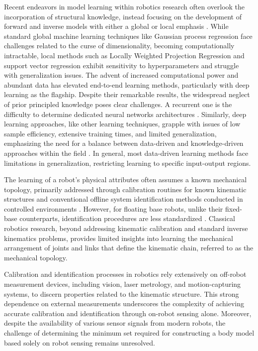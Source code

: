 \documentclass[12pt, a4paper]{article}
\begin{document}
\newpage
Recent endeavors in model learning within robotics research often overlook the incorporation of structural knowledge, instead focusing on the development of forward and inverse models with either a global or local emphasis \cite{NguyenTuong2011Modellearningrobot}. While standard global machine learning techniques like Gaussian process regression face challenges related to the curse of dimensionality, becoming computationally intractable, local methods such as Locally Weighted Projection Regression and support vector regression exhibit sensitivity to hyperparameters and struggle with generalization issues. The advent of increased computational power and abundant data has elevated end-to-end learning methods, particularly with deep learning as the flagship. Despite their remarkable results, the widespread neglect of prior principled knowledge poses clear challenges. A recurrent one is the difficulty to determine dedicated neural networks architectures  \cite{Baker2017Designingneuralnetwork,Elsken2019Neuralarchitecturesearch}. Similarly, deep learning approaches, like other learning techniques, grapple with issues of low sample efficiency, extensive training times, and limited generalization, emphasizing the need for a balance between data-driven and knowledge-driven approaches within the field \cite{Pierson2017Deeplearningrobotics,Suenderhauf2018limitspotentialsdeep}. In general, most data-driven learning methods face limitations in generalization, restricting learning to specific input-output regions.

The learning of a robot's physical attributes often assumes a known mechanical topology, primarily addressed through calibration routines for known kinematic structures \cite{Hollerbach1996CalibrationIndexTaxonomy} and conventional offline system identification methods conducted in controlled environments \cite{Swevers2007Dynamicmodelidentification,LeboutetInertialParameterIdentification}. However, for floating base robots, unlike their fixed-base counterparts, identification procedures are less standardized \cite{Ayusawa2014Identifiabilityidentificationinertial,Lee2022OptimizedSystemIdentification}. Classical robotics research, beyond addressing kinematic calibration and standard inverse kinematics problems, provides limited insights into learning the mechanical arrangement of joints and links that define the kinematic chain, referred to as the mechanical topology.

Calibration and identification processes in robotics rely extensively on off-robot measurement devices, including vision, laser metrology, and motion-capturing systems, to discern properties related to the kinematic structure. This strong dependence on external measurements underscores the complexity of achieving accurate calibration and identification through on-robot sensing alone. Moreover, despite the availability of various sensor signals from modern robots, the challenge of determining the minimum set required for constructing a body model based solely on robot sensing remains unresolved.
\end{document}
